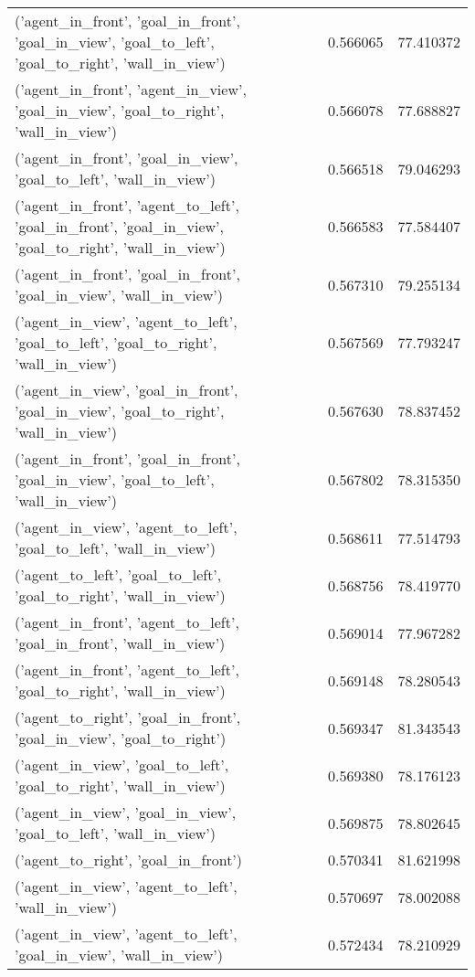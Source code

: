 \begin{tabular}{lrr}
('agent\_in\_front', 'goal\_in\_front', 'goal\_in\_view', 'goal\_to\_left', 'goal\_to\_right', 'wall\_in\_view') & 0.566065 & 77.410372 \\
('agent\_in\_front', 'agent\_in\_view', 'goal\_in\_view', 'goal\_to\_right', 'wall\_in\_view') & 0.566078 & 77.688827 \\
('agent\_in\_front', 'goal\_in\_view', 'goal\_to\_left', 'wall\_in\_view') & 0.566518 & 79.046293 \\
('agent\_in\_front', 'agent\_to\_left', 'goal\_in\_front', 'goal\_in\_view', 'goal\_to\_right', 'wall\_in\_view') & 0.566583 & 77.584407 \\
('agent\_in\_front', 'goal\_in\_front', 'goal\_in\_view', 'wall\_in\_view') & 0.567310 & 79.255134 \\
('agent\_in\_view', 'agent\_to\_left', 'goal\_to\_left', 'goal\_to\_right', 'wall\_in\_view') & 0.567569 & 77.793247 \\
('agent\_in\_view', 'goal\_in\_front', 'goal\_in\_view', 'goal\_to\_right', 'wall\_in\_view') & 0.567630 & 78.837452 \\
('agent\_in\_front', 'goal\_in\_front', 'goal\_in\_view', 'goal\_to\_left', 'wall\_in\_view') & 0.567802 & 78.315350 \\
('agent\_in\_view', 'agent\_to\_left', 'goal\_to\_left', 'wall\_in\_view') & 0.568611 & 77.514793 \\
('agent\_to\_left', 'goal\_to\_left', 'goal\_to\_right', 'wall\_in\_view') & 0.568756 & 78.419770 \\
('agent\_in\_front', 'agent\_to\_left', 'goal\_in\_front', 'wall\_in\_view') & 0.569014 & 77.967282 \\
('agent\_in\_front', 'agent\_to\_left', 'goal\_to\_right', 'wall\_in\_view') & 0.569148 & 78.280543 \\
('agent\_to\_right', 'goal\_in\_front', 'goal\_in\_view', 'goal\_to\_right') & 0.569347 & 81.343543 \\
('agent\_in\_view', 'goal\_to\_left', 'goal\_to\_right', 'wall\_in\_view') & 0.569380 & 78.176123 \\
('agent\_in\_view', 'goal\_in\_view', 'goal\_to\_left', 'wall\_in\_view') & 0.569875 & 78.802645 \\
('agent\_to\_right', 'goal\_in\_front') & 0.570341 & 81.621998 \\
('agent\_in\_view', 'agent\_to\_left', 'wall\_in\_view') & 0.570697 & 78.002088 \\
('agent\_in\_view', 'agent\_to\_left', 'goal\_in\_view', 'wall\_in\_view') & 0.572434 & 78.210929 \\

\end{tabular}
